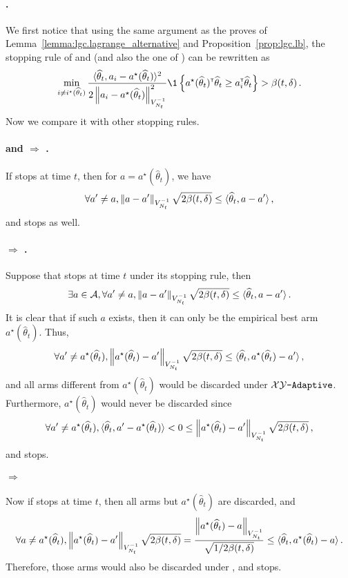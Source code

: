\paragraph{\LG{}.}
We first notice that using the same argument as the proves of Lemma~\ref{lemma:lgc.lagrange_alternative} and Proposition~\ref{prop:lgc.lb}, the stopping rule of \LG and \LGC (and also the one of \GLUCB) can be rewritten as
\[
	\min_{i \neq i^\star(\hat{\theta}_{t})} \dfrac{\langle\hat\theta_t,a_{i}-a^\star(\hat\theta_t)\rangle^2}{2\normm{a_i - a^\star(\hat\theta_t)}_{{V_{N_t}^{-1}}}^2} \1\left\{a^\star(\hat\theta_t)^\top\hat\theta_t \geq a_i^\top\hat\theta_t\right\} > \beta(t,\delta)\,.
\]
Now we compare it with other stopping rules.

\paragraph{\LGC and \LG $\Rightarrow$ \XYS.}
If \LGC stops at time $t$, then for $a = a^\star(\hat\theta_t)$, we have
\[
    \forall a'\neq a, \left\lVert a-a'\right\rVert_{V_{N_t}^{-1}}\sqrt{2\beta(t,\delta)}\leq \langle\widehat\theta_t,a - a'\rangle\,,
\]
and \XYS stops as well.

\paragraph{\XYS $\Rightarrow$ \XYA.}
Suppose that \XYS stops at time $t$ under its stopping rule, then
\[
\exists a\in\mathcal{A}, \forall a'\neq a, \left\lVert a-a'\right\rVert_{V_{N_t}^{-1}}\sqrt{2\beta(t,\delta)}\leq \langle\widehat\theta_t,a - a'\rangle\,.
\]
It is clear that if such $a$ exists, then it can only be the empirical best arm $a^\star(\hat\theta_t)$. Thus,
\[
    \forall a'\neq a^\star(\widehat\theta_t), \left\lVert a^\star(\widehat\theta_t)-a'\right\rVert_{V_{N_t}^{-1}}\sqrt{2\beta(t,\delta)}\leq\langle\widehat\theta_t,a^\star(\widehat\theta_t)-a'\rangle\,,
\]
and all arms different from $a^\star(\hat\theta_t)$ would be discarded under $\texttt{$\mathcal{X}\mathcal{Y}$-Adaptive}$. Furthermore, $a^\star(\hat\theta_t)$ would never be discarded since
\[
    \forall a'\neq a^\star(\widehat\theta_t), \langle\widehat\theta_t,a'-a^\star(\widehat\theta_t)\rangle < 0 \le \left\lVert a^\star(\widehat\theta_t)-a'\right\rVert_{V_{N_t}^{-1}}\sqrt{2\beta(t,\delta)}\,,
\]
and \XYA stops.

\paragraph{\XYA $\Rightarrow$ \ALBA}
Now if \XYA stops at time $t$, then all arms but $a^\star(\hat\theta_t)$ are discarded, and
\[
    \forall a \neq a^\star(\widehat\theta_t), \left\lVert a^\star(\widehat\theta_t)-a'\right\rVert_{V_{N_t}^{-1}}\sqrt{2\beta(t,\delta)} = \dfrac{\left\lVert a^\star(\widehat\theta_t)-a\right\rVert_{V_{N_t}^{-1}}}{\sqrt{1/2\beta(t,\delta)}} \le \langle\widehat\theta_t,a^\star(\widehat\theta_t)-a\rangle\,.
\]
Therefore, those arms would also be discarded under \ALBA, and \ALBA stops.

